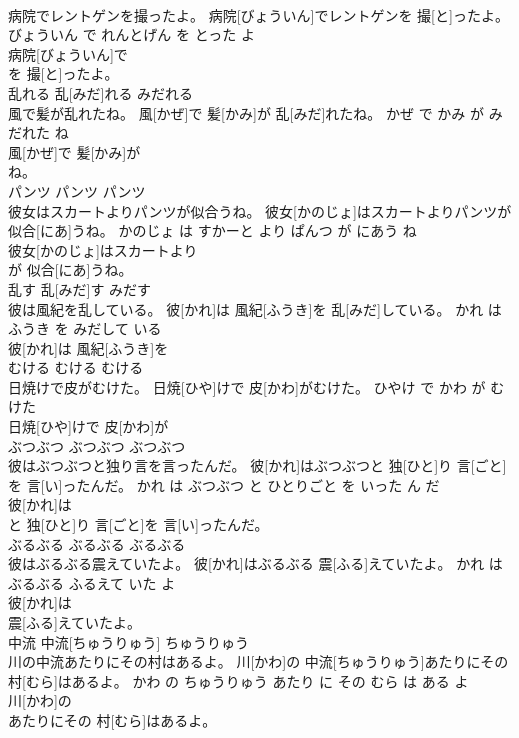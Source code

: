 \documentclass[8pt]{extreport}
\begin{document}
\begin{CJK}{UTF8}{min}
\\	病院でレントゲンを撮ったよ。	病院[びょういん]でレントゲンを 撮[と]ったよ。	びょういん で れんとげん を とった よ	
\\	病院[びょういん]で
\\	を 撮[と]ったよ。			
\\	乱れる	乱[みだ]れる	みだれる	
\\	風で髪が乱れたね。	風[かぜ]で 髪[かみ]が 乱[みだ]れたね。	かぜ で かみ が みだれた ね	
\\	風[かぜ]で 髪[かみ]が
\\	ね。			
\\	パンツ	パンツ	パンツ	
\\	彼女はスカートよりパンツが似合うね。	彼女[かのじょ]はスカートよりパンツが 似合[にあ]うね。	かのじょ は すかーと より ぱんつ が にあう ね	
\\	彼女[かのじょ]はスカートより
\\	が 似合[にあ]うね。			
\\	乱す	乱[みだ]す	みだす	
\\	彼は風紀を乱している。	彼[かれ]は 風紀[ふうき]を 乱[みだ]している。	かれ は ふうき を みだして いる	
\\	彼[かれ]は 風紀[ふうき]を
\\	むける	むける	むける	
\\	日焼けで皮がむけた。	日焼[ひや]けで 皮[かわ]がむけた。	ひやけ で かわ が むけた	
\\	日焼[ひや]けで 皮[かわ]が
\\	ぶつぶつ	ぶつぶつ	ぶつぶつ	
\\	彼はぶつぶつと独り言を言ったんだ。	彼[かれ]はぶつぶつと 独[ひと]り 言[ごと]を 言[い]ったんだ。	かれ は ぶつぶつ と ひとりごと を いった ん だ	
\\	彼[かれ]は
\\	と 独[ひと]り 言[ごと]を 言[い]ったんだ。			
\\	ぶるぶる	ぶるぶる	ぶるぶる	
\\	彼はぶるぶる震えていたよ。	彼[かれ]はぶるぶる 震[ふる]えていたよ。	かれ は ぶるぶる ふるえて いた よ	
\\	彼[かれ]は
\\	震[ふる]えていたよ。			
\\	中流	中流[ちゅうりゅう]	ちゅうりゅう	
\\	川の中流あたりにその村はあるよ。	川[かわ]の 中流[ちゅうりゅう]あたりにその 村[むら]はあるよ。	かわ の ちゅうりゅう あたり に その むら は ある よ	
\\	川[かわ]の
\\	あたりにその 村[むら]はあるよ。			

\end{CJK}
\end{document}
